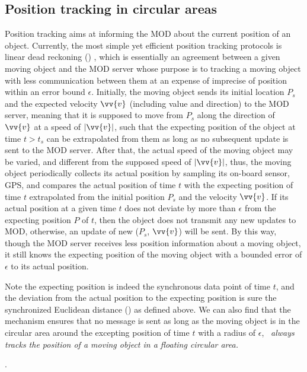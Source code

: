 \subsection{Position tracking in circular areas}

Position tracking aims at informing the MOD about the current position of an object. Currently, the most simple yet efficient position tracking protocols is linear dead reckoning (\ldr) \cite{ Wolfson:PositionTracking}, which is essentially an agreement between a given moving object and the MOD server whose purpose is to tracking a moving object with less communication between them at an expense of imprecise of position within an error bound $\epsilon$.  
%
Initially, the moving object sends its initial location $P_s$ and the expected velocity $\vv{v}$
(including value and direction) to the MOD server, meaning that it is supposed to move from $P_s$ along the direction of $\vv{v}$ at a speed of $|\vv{v}|$, such that the expecting position of the object at time $t>t_s$ can be extrapolated from them as long as no subsequent update is sent to the MOD server. 
After that, the actual speed of the moving object may be varied, and different from the supposed speed of $|\vv{v}|$, thus, the moving object periodically collects its actual position by sampling its on-board sensor, \eg GPS, and compares the actual position of time $t$ with the expecting position of time $t$ extrapolated from the initial position $P_s$ and the velocity $\vv{v}$. If its actual position at a given time $t$ does not deviate by more than $\epsilon$ from the expecting position $P$ of $t$, then the object does not transmit any new updates to MOD, otherwise, an update of new ($P_s$, $\vv{v}$) will be sent.
%
By this way, though the MOD server receives less position information about a moving object, it still knows the expecting position of the moving object with a bounded error of $\epsilon$ to its actual position.



Note the expecting position is indeed the synchronous data point \wrt of time $t$, and the deviation from the actual position to the expecting position is sure the synchronized Euclidean distance (\sed) as defined above. We can also find that the \ldr mechanism ensures that no message is sent as long as the moving object is in the circular area around the excepting position of time $t$ with a radius of $\epsilon$, \ie~\emph{\ldr always tracks the position of a moving object in a floating circular area.}

\begin{example}
	\label{exm-ldr}
	\todo.
\end{example}

